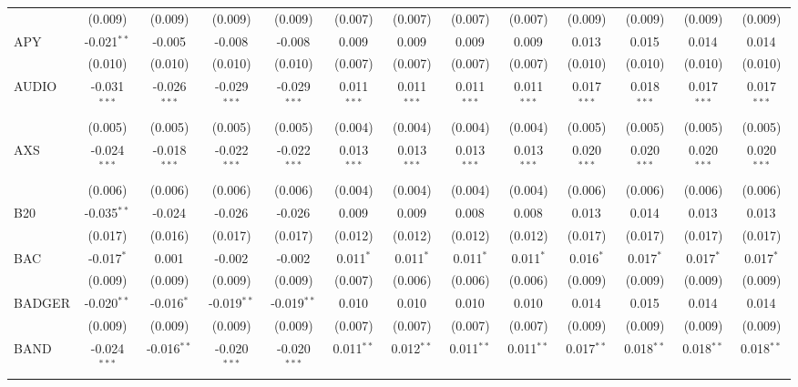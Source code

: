 \begin{table}[!htbp]
\begin{tabular}{@{\extracolsep{5pt}}lcccccccccccc}
  & (0.009) & (0.009) & (0.009) & (0.009) & (0.007) & (0.007) & (0.007) & (0.007) & (0.009) & (0.009) & (0.009) & (0.009) \\
 APY & -0.021$^{**}$ & -0.005$^{}$ & -0.008$^{}$ & -0.008$^{}$ & 0.009$^{}$ & 0.009$^{}$ & 0.009$^{}$ & 0.009$^{}$ & 0.013$^{}$ & 0.015$^{}$ & 0.014$^{}$ & 0.014$^{}$ \\
  & (0.010) & (0.010) & (0.010) & (0.010) & (0.007) & (0.007) & (0.007) & (0.007) & (0.010) & (0.010) & (0.010) & (0.010) \\
 AUDIO & -0.031$^{***}$ & -0.026$^{***}$ & -0.029$^{***}$ & -0.029$^{***}$ & 0.011$^{***}$ & 0.011$^{***}$ & 0.011$^{***}$ & 0.011$^{***}$ & 0.017$^{***}$ & 0.018$^{***}$ & 0.017$^{***}$ & 0.017$^{***}$ \\
  & (0.005) & (0.005) & (0.005) & (0.005) & (0.004) & (0.004) & (0.004) & (0.004) & (0.005) & (0.005) & (0.005) & (0.005) \\
 AXS & -0.024$^{***}$ & -0.018$^{***}$ & -0.022$^{***}$ & -0.022$^{***}$ & 0.013$^{***}$ & 0.013$^{***}$ & 0.013$^{***}$ & 0.013$^{***}$ & 0.020$^{***}$ & 0.020$^{***}$ & 0.020$^{***}$ & 0.020$^{***}$ \\
  & (0.006) & (0.006) & (0.006) & (0.006) & (0.004) & (0.004) & (0.004) & (0.004) & (0.006) & (0.006) & (0.006) & (0.006) \\
 B20 & -0.035$^{**}$ & -0.024$^{}$ & -0.026$^{}$ & -0.026$^{}$ & 0.009$^{}$ & 0.009$^{}$ & 0.008$^{}$ & 0.008$^{}$ & 0.013$^{}$ & 0.014$^{}$ & 0.013$^{}$ & 0.013$^{}$ \\
  & (0.017) & (0.016) & (0.017) & (0.017) & (0.012) & (0.012) & (0.012) & (0.012) & (0.017) & (0.017) & (0.017) & (0.017) \\
 BAC & -0.017$^{*}$ & 0.001$^{}$ & -0.002$^{}$ & -0.002$^{}$ & 0.011$^{*}$ & 0.011$^{*}$ & 0.011$^{*}$ & 0.011$^{*}$ & 0.016$^{*}$ & 0.017$^{*}$ & 0.017$^{*}$ & 0.017$^{*}$ \\
  & (0.009) & (0.009) & (0.009) & (0.009) & (0.007) & (0.006) & (0.006) & (0.006) & (0.009) & (0.009) & (0.009) & (0.009) \\
 BADGER & -0.020$^{**}$ & -0.016$^{*}$ & -0.019$^{**}$ & -0.019$^{**}$ & 0.010$^{}$ & 0.010$^{}$ & 0.010$^{}$ & 0.010$^{}$ & 0.014$^{}$ & 0.015$^{}$ & 0.014$^{}$ & 0.014$^{}$ \\
  & (0.009) & (0.009) & (0.009) & (0.009) & (0.007) & (0.007) & (0.007) & (0.007) & (0.009) & (0.009) & (0.009) & (0.009) \\
 BAND & -0.024$^{***}$ & -0.016$^{**}$ & -0.020$^{***}$ & -0.020$^{***}$ & 0.011$^{**}$ & 0.012$^{**}$ & 0.011$^{**}$ & 0.011$^{**}$ & 0.017$^{**}$ & 0.018$^{**}$ & 0.018$^{**}$ & 0.018$^{**}$ \\

\end{tabular}
\end{table}
